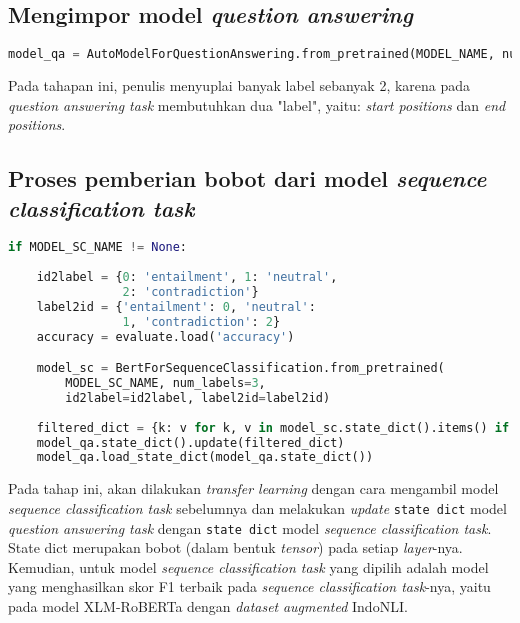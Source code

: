 \subsection{Mengimpor model \emph{question answering}}
\begin{lstlisting}[language=Python, caption=Mengimpor model \emph{question answering}]
model_qa = AutoModelForQuestionAnswering.from_pretrained(MODEL_NAME, num_labels=2)
\end{lstlisting}

Pada tahapan ini, penulis menyuplai banyak label sebanyak 2, karena pada \emph{question answering task} membutuhkan dua "label", yaitu: \emph{start positions} dan \emph{end positions}.

\subsection{Proses pemberian bobot dari model \emph{sequence classification task}}
\begin{lstlisting}[language=Python, caption=Proses pemberian bobot dari model \emph{sequence classification task}]
if MODEL_SC_NAME != None:
    
    id2label = {0: 'entailment', 1: 'neutral', 
                2: 'contradiction'}
    label2id = {'entailment': 0, 'neutral': 
                1, 'contradiction': 2}
    accuracy = evaluate.load('accuracy')

    model_sc = BertForSequenceClassification.from_pretrained(
        MODEL_SC_NAME, num_labels=3, 
        id2label=id2label, label2id=label2id)
    
    filtered_dict = {k: v for k, v in model_sc.state_dict().items() if k in model_qa.state_dict()}
    model_qa.state_dict().update(filtered_dict)
    model_qa.load_state_dict(model_qa.state_dict())
\end{lstlisting}

Pada tahap ini, akan dilakukan \emph{transfer learning} dengan cara mengambil model \emph{sequence classification task} sebelumnya dan melakukan \emph{update} \texttt{state dict} model \emph{question answering task} dengan \texttt{state dict} model \emph{sequence classification task}. State dict merupakan bobot (dalam bentuk \emph{tensor}) pada setiap \emph{layer}-nya. Kemudian, untuk model \emph{sequence classification task} yang dipilih adalah model yang menghasilkan skor F1 terbaik pada \emph{sequence classification task}-nya, yaitu pada model XLM-RoBERTa dengan \emph{dataset} \emph{augmented} IndoNLI.

